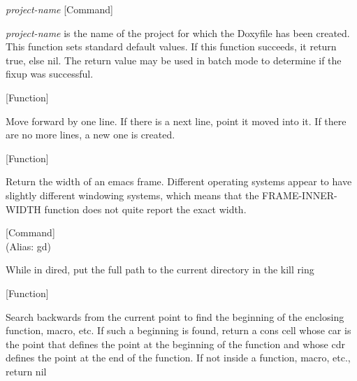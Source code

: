 \vspace{1em}
\noindent
{}
\usebox{\funcname}\emph{project-name}
 \hfill [Command]

\begin{doc-string}
\emph{project-name} is the name of the project for which the Doxyfile has been created.
This function sets standard default values.
If this function succeeds, it return true, else nil.  The return value may be used
in batch mode to determine if the fixup was successful.
\end{doc-string}

\vspace{1em}
\noindent
{}
\usebox{\funcname}
 \hfill [Function]

\begin{doc-string}
Move forward by one line.  If there is a next line, point it moved into
it.  If there are no more lines, a new one is created.
\end{doc-string}

\vspace{1em}
\noindent
{}
\usebox{\funcname}
 \hfill [Function]

\begin{doc-string}
Return the width of an emacs frame.  Different operating systems appear to
have slightly different windowing systems, which means that the
FRAME-INNER-WIDTH function does not quite report the exact width.
\end{doc-string}

\vspace{1em}
\noindent
{}
\usebox{\funcname}
 \hfill [Command]\\%
 (Alias: gd)

\begin{doc-string}
While in dired, put the full path to the current directory in the kill ring
\end{doc-string}

\vspace{1em}
\noindent
{}
\usebox{\funcname}
 \hfill [Function]

\begin{doc-string}
Search backwards from the current point to find the beginning of the enclosing
function, macro, etc.  If such a beginning is found, return a cons cell whose car
is the point that defines the point at the beginning of the function and whose cdr
defines the point at the end of the function.  If not inside a function, macro, etc.,
return nil
\end{doc-string}


